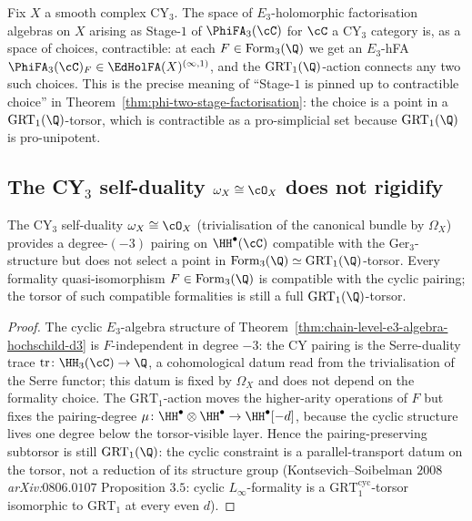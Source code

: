 \begin{remark}
\label{rem:form3-contractibility-on-fixed-x}
Fix $X$ a smooth complex CY$_3$. The space of $E_3$-holomorphic
factorisation algebras on $X$ arising as Stage-$1$ of $\PhiFA_3(\cC)$ for
$\cC$ a CY$_3$ category is, as a space of choices, contractible: at
each $F \in \mathrm{Form}_3(\Q)$ we get an $E_3$-hFA
$\PhiFA_3(\cC)_F \in \EdHolFA(X)^{(\infty,1)}$, and the
$\mathrm{GRT}_1(\Q)$-action connects any two such choices. This is the
precise meaning of ``Stage-$1$ is pinned up to contractible choice'' in
Theorem~\ref{thm:phi-two-stage-factorisation}: the choice is a point in
a $\mathrm{GRT}_1(\Q)$-torsor, which is contractible as a pro-simplicial
set because $\mathrm{GRT}_1(\Q)$ is pro-unipotent.
\end{remark}

\subsection*{The CY$_3$ self-duality $\omega_X \cong \cO_X$ does not rigidify}

\begin{proposition}
\label{prop:cy3-self-duality-torsor-not-rigidified}
\ClaimStatusTheorem
The CY$_3$ self-duality $\omega_X \cong \cO_X$ (trivialisation of the
canonical bundle by $\Omega_X$) provides a degree-$(-3)$ pairing on
$\HH^\bullet(\cC)$ compatible with the $\mathrm{Ger}_3$-structure but does not
select a point in $\mathrm{Form}_3(\Q) \simeq
\mathrm{GRT}_1(\Q)$-torsor. Every formality quasi-isomorphism
$F \in \mathrm{Form}_3(\Q)$ is compatible with the cyclic pairing; the
torsor of such compatible formalities is still a full
$\mathrm{GRT}_1(\Q)$-torsor.
\end{proposition}

\begin{proof}
The cyclic $E_3$-algebra structure of
Theorem~\ref{thm:chain-level-e3-algebra-hochschild-d3} is
$F$-independent in degree $-3$: the CY pairing is the Serre-duality
trace $\mathrm{tr} \colon \HH_3(\cC) \to \Q$, a cohomological datum
read from the trivialisation of the Serre functor; this datum is
fixed by $\Omega_X$ and does not depend on the formality choice.
The $\mathrm{GRT}_1$-action moves the higher-arity operations of $F$
but fixes the pairing-degree $\mu \colon \HH^\bullet \otimes
\HH^\bullet \to \HH^\bullet[-d]$, because the cyclic structure lives
one degree below the torsor-visible layer. Hence the
pairing-preserving subtorsor is still $\mathrm{GRT}_1(\Q)$: the cyclic
constraint is a parallel-transport datum on the torsor, not a reduction
of its structure group (Kontsevich--Soibelman $2008$
\textit{arXiv:$0806.0107$} Proposition $3.5$: cyclic $L_\infty$-formality
is a $\mathrm{GRT}_1^{\mathrm{cyc}}$-torsor isomorphic to
$\mathrm{GRT}_1$ at every even $d$).
\end{proof}


